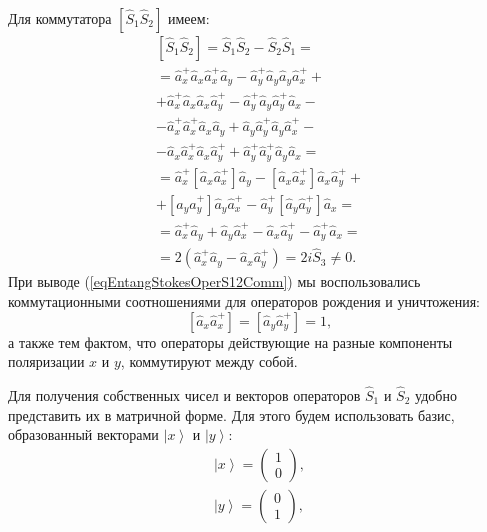 Для коммутатора $\left[\hat{S}_1\hat{S}_2\right]$ имеем:
\begin{eqnarray}
\left[\hat{S}_1\hat{S}_2\right] = \hat{S}_1\hat{S}_2 -
\hat{S}_2\hat{S}_1 = 
\nonumber \\
=
\hat{a}_x^{+}\hat{a}_x\hat{a}_x^{+}\hat{a}_y -
\hat{a}_y^{+}\hat{a}_y\hat{a}_y\hat{a}_x^{+} + 
\nonumber \\
+ \hat{a}_x^{+}\hat{a}_x\hat{a}_x\hat{a}_y^{+} -
\hat{a}_y^{+}\hat{a}_y\hat{a}_y^{+}\hat{a}_x -
\nonumber \\
- \hat{a}_x^{+}\hat{a}_x^{+}\hat{a}_x\hat{a}_y +
\hat{a}_y\hat{a}_y^{+}\hat{a}_y\hat{a}_x^{+} -
\nonumber \\
- \hat{a}_x\hat{a}_x^{+}\hat{a}_x\hat{a}_y^{+} +
\hat{a}_y^{+}\hat{a}_y^{+}\hat{a}_y\hat{a}_x =
\nonumber \\
= \hat{a}_x^{+}\left[\hat{a}_x\hat{a}_x^{+}\right]\hat{a}_y -
\left[\hat{a}_x\hat{a}_x^{+}\right]\hat{a}_x\hat{a}_y^{+} +
\nonumber \\
+\left[\hat{a}_y\hat{a}_y^{+}\right]\hat{a}_y\hat{a}_x^{+} -
\hat{a}_y^{+}\left[\hat{a}_y\hat{a}_y^{+}\right]\hat{a}_x =
\nonumber \\
= \hat{a}_x^{+}\hat{a}_y + \hat{a}_y\hat{a}_x^{+} -
\hat{a}_x\hat{a}_y^{+} - \hat{a}_y^{+}\hat{a}_x = 
\nonumber \\
= 2 \left(\hat{a}_x^{+}\hat{a}_y - \hat{a}_x\hat{a}_y^{+}\right) = 2 i
\hat{S}_3 \ne 0.
\label{eqEntangStokesOperS12Comm}
\end{eqnarray}
При выводе (\ref{eqEntangStokesOperS12Comm}) мы воспользовались
коммутационными соотношениями для операторов рождения и уничтожения:
\begin{equation}
\left[\hat{a}_x \hat{a}^{+}_x\right] = \left[\hat{a}_y \hat{a}^{+}_y\right] = 1,
\nonumber
\end{equation}
а также тем фактом, что операторы действующие на разные компоненты
поляризации $x$ и $y$, коммутируют между собой.

Для получения собственных чисел и векторов операторов $\hat{S}_1$ и
$\hat{S}_2$ удобно представить их в матричной форме. Для этого будем
использовать базис, образованный векторами $\left|x\right>$ и
$\left|y\right>$:
\begin{eqnarray}
\left|x\right> = \left(
\begin{array}{c}
1 \\
0
\end{array}
\right),
\nonumber \\
\left|y\right> = \left(
\begin{array}{c}
0 \\
1
\end{array}
\right),
\nonumber
\end{eqnarray}

